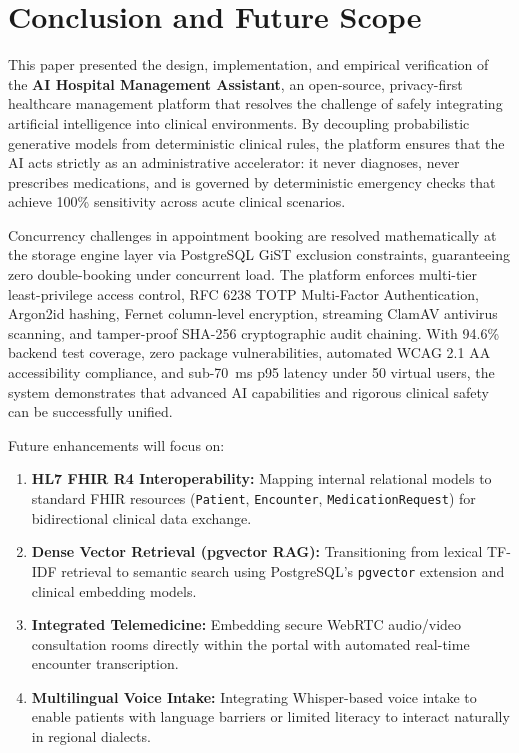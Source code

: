 \documentclass[conference]{IEEEtran}
\begin{document}
\section{Conclusion and Future Scope}
\label{sec:conclusion}
This paper presented the design, implementation, and empirical verification of the \textbf{AI Hospital Management Assistant}, an open-source, privacy-first healthcare management platform that resolves the challenge of safely integrating artificial intelligence into clinical environments. By decoupling probabilistic generative models from deterministic clinical rules, the platform ensures that the AI acts strictly as an administrative accelerator: it never diagnoses, never prescribes medications, and is governed by deterministic emergency checks that achieve 100\% sensitivity across acute clinical scenarios.

Concurrency challenges in appointment booking are resolved mathematically at the storage engine layer via PostgreSQL GiST exclusion constraints, guaranteeing zero double-booking under concurrent load. The platform enforces multi-tier least-privilege access control, RFC 6238 TOTP Multi-Factor Authentication, Argon2id hashing, Fernet column-level encryption, streaming ClamAV antivirus scanning, and tamper-proof SHA-256 cryptographic audit chaining. With 94.6\% backend test coverage, zero package vulnerabilities, automated WCAG 2.1 AA accessibility compliance, and sub-70~ms p95 latency under 50 virtual users, the system demonstrates that advanced AI capabilities and rigorous clinical safety can be successfully unified.

Future enhancements will focus on:
\begin{enumerate}
    \item \textbf{HL7 FHIR R4 Interoperability:} Mapping internal relational models to standard FHIR resources (\texttt{Patient}, \texttt{Encounter}, \texttt{MedicationRequest}) for bidirectional clinical data exchange.
    \item \textbf{Dense Vector Retrieval (pgvector RAG):} Transitioning from lexical TF-IDF retrieval to semantic search using PostgreSQL's \texttt{pgvector} extension and clinical embedding models.
    \item \textbf{Integrated Telemedicine:} Embedding secure WebRTC audio/video consultation rooms directly within the portal with automated real-time encounter transcription.
    \item \textbf{Multilingual Voice Intake:} Integrating Whisper-based voice intake to enable patients with language barriers or limited literacy to interact naturally in regional dialects.
\end{enumerate}
\end{document}
